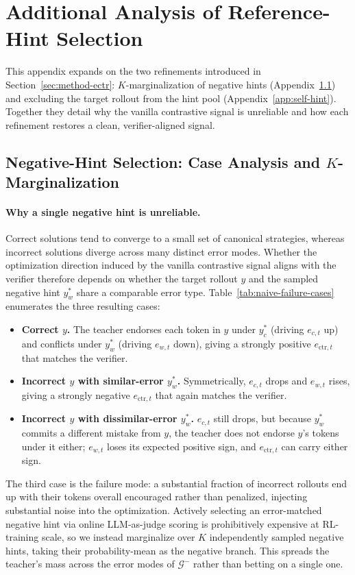 \newpage

\section{Additional Analysis of Reference-Hint Selection}
\label{app:hint-selection}

This appendix expands on the two refinements introduced in
Section~\ref{sec:method-ectr}: $K$-marginalization of negative hints
(Appendix~\ref{app:negative-hint}) and excluding the target rollout from the
hint pool (Appendix~\ref{app:self-hint}). Together they detail why the vanilla
contrastive signal is unreliable and how each refinement restores a clean,
verifier-aligned signal.

\subsection{Negative-Hint Selection: Case Analysis and \texorpdfstring{$K$}{K}-Marginalization}
\label{app:negative-hint}

\paragraph{Why a single negative hint is unreliable.}
Correct solutions tend to converge to a small set of canonical strategies,
whereas incorrect solutions diverge across many distinct error modes. Whether
the optimization direction induced by the vanilla contrastive signal aligns
with the verifier therefore depends on whether the target rollout $y$ and the
sampled negative hint $y_w^*$ share a comparable error type.
Table~\ref{tab:naive-failure-cases} enumerates the three resulting cases:
\begin{itemize}
    \item \textbf{Correct $y$.} The teacher endorses each token in $y$ under $y_c^*$ (driving $e_{c,t}$ up) and conflicts under $y_w^*$ (driving $e_{w,t}$ down), giving a strongly positive $e_{\text{ctr},t}$ that matches the verifier.
    \item \textbf{Incorrect $y$ with similar-error $y_w^*$.} Symmetrically, $e_{c,t}$ drops and $e_{w,t}$ rises, giving a strongly negative $e_{\text{ctr},t}$ that again matches the verifier.
    \item \textbf{Incorrect $y$ with dissimilar-error $y_w^*$.} $e_{c,t}$ still drops, but because $y_w^*$ commits a different mistake from $y$, the teacher does not endorse $y$'s tokens under it either; $e_{w,t}$ loses its expected positive sign, and $e_{\text{ctr},t}$ can carry either sign.
\end{itemize}
The third case is the failure mode: a substantial fraction of incorrect
rollouts end up with their tokens overall encouraged rather than penalized,
injecting substantial noise into the optimization. Actively selecting an
error-matched negative hint via online LLM-as-judge scoring is prohibitively
expensive at RL-training scale, so we instead marginalize over $K$
independently sampled negative hints, taking their probability-mean as the
negative branch. This spreads the teacher's mass across the error modes of
$\mathcal{G}^-$ rather than betting on a single one.

